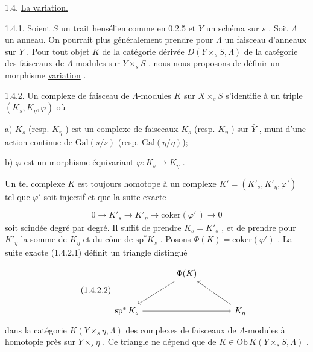 1.4. \underline{La variation.}

1.4.1. Soient $S$ un trait hensélien comme en 0.2.5 et $Y$ un schéma sur $s$ . Soit $\Lambda$ un anneau. On pourrait plus généralement prendre pour $\Lambda$ un faisceau d'anneaux sur $Y$ . Pour tout objet $K$ de la catégorie dérivée $D(Y \times_s S, \Lambda)$ de la catégorie des faisceaux de $\Lambda$-modules sur $Y \times_s S$ , nous nous proposons de définir un morphisme \underline{variation} .

1.4.2. Un complexe de faisceau de $\Lambda$-modules $K$ sur $X \times_s S$ s'identifie à un triple $(K_s, K_\eta , \varphi)$ où

a) $K_s$ (resp. $K_\eta$ ) est un complexe de faisceaux $K_{\bar{s}}$ (resp. $K_{\bar{\eta}}$ ) sur $\bar{Y}$ , muni d'une action continue de $\mathrm{Gal}(\bar{s}/\bar{s})$ (resp. $\mathrm{Gal}(\bar{\eta}/\eta)$);

b) $\varphi$ est un morphisme équivariant $\varphi\colon K_{\bar{s}} \to K_{\bar{\eta}}$ .

Un tel complexe $K$ est toujours homotope à un complexe $K' = (K'_s, K'_\eta , \varphi')$ tel que $\varphi'$ soit injectif et que la suite exacte

\begin{equation}\tag{1.4.2.1}
0 \longrightarrow K'_{\bar{s}} \longrightarrow K'_{\bar{\eta}} \longrightarrow \mathrm{coker}(\varphi'\,) \longrightarrow 0
\end{equation}
soit scindée degré par degré. Il suffit de prendre $K_s = K'_s$ , et de prendre pour $K'_\eta$ la somme de $K_\eta$ et du cône de $\mathrm{sp}^* K_s$ . Posons $\Phi(K) = \mathrm{coker}(\varphi')$ . La suite exacte (1.4.2.1) définit un triangle distingué

\begin{equation}\tag{1.4.2.2}
\begin{tikzcd}[column sep=large, row sep=large]
{} & \Phi(K) \arrow[dl] & {} \\
\mathrm{sp}^*\, K_s \arrow[rr] & {} & K_\eta \arrow[ul]
\end{tikzcd}
\end{equation}
dans la catégorie $K(Y \times_s \eta , \Lambda)$ des complexes de faisceaux de $\Lambda$-modules à homotopie près sur $Y \times_s \eta$ . Ce triangle ne dépend que de $K \in \mathrm{Ob}\, K(Y \times_s S, \Lambda)$ .


